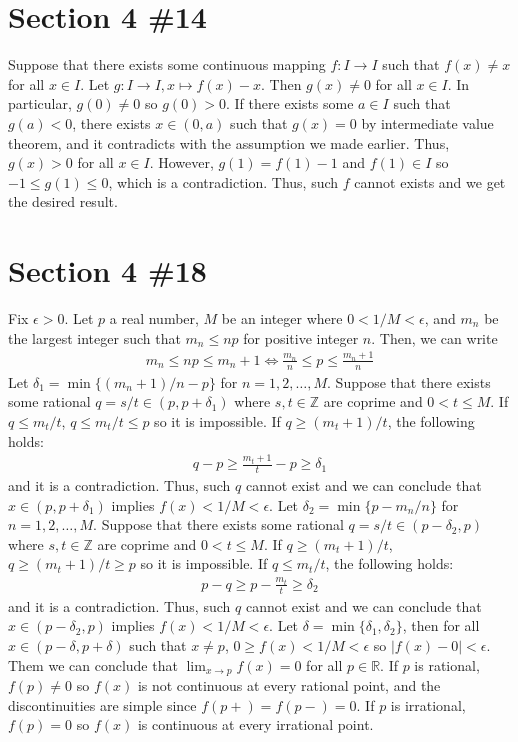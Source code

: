 \documentclass{scrartcl}
\begin{document}
\section{Section 4 \#14}
Suppose that there exists some continuous mapping \(f : I \to I\) such that \(f(x) \not = x\) for all \(x \in I\).
Let \(g: I \to I, x \mapsto f(x) - x\).
Then \(g(x) \not = 0\) for all \(x \in I\).
In particular, \(g(0) \not = 0\) so \(g(0) > 0\).
If there exists some \(a \in I\) such that \(g(a) < 0\), there exists \(x \in (0, a)\) such that \(g(x) = 0\) by intermediate value theorem, and it contradicts with the assumption we made earlier.
Thus, \(g(x) > 0\) for all \(x \in I\).
However, \(g(1) = f(1) - 1\) and \(f(1) \in I\) so \(-1 \leq g(1) \leq 0\), which is a contradiction.
Thus, such \(f\) cannot exists and we get the desired result.

\section{Section 4 \#18}
Fix \(\epsilon > 0\).
Let \(p\) a real number, \(M\) be an integer where \(0 < 1 / M < \epsilon\), and \(m_n\) be the largest integer such that \(m_n \leq np\) for positive integer \(n\).
Then, we can write
\begin{align*}
  m_n \leq np \leq m_n + 1 \Longleftrightarrow \frac{m_n}{n} \leq p \leq \frac{m_n + 1}{n}
\end{align*}
Let \(\delta_1 = \min \{(m_n + 1) / n - p\}\) for \(n = 1, 2, \dots, M\).
Suppose that there exists some rational \(q = s / t \in (p, p + \delta_1)\) where \(s, t \in \mathbb{Z}\) are coprime and \(0 < t \leq M\).
If \(q \leq m_t / t\), \(q \leq m_t / t \leq p\) so it is impossible.
If \(q \geq (m_t + 1) / t\), the following holds:
\begin{align*}
  q - p \geq \frac{m_t + 1}{t} - p \geq \delta_1
\end{align*}
and it is a contradiction.
Thus, such \(q\) cannot exist and we can conclude that \(x \in (p, p + \delta_1)\) implies \(f(x) < 1 / M < \epsilon\).
Let \(\delta_2 = \min\{p - m_n / n\}\) for \(n = 1, 2, \dots, M\).
Suppose that there exists some rational \(q = s / t \in (p - \delta_2, p)\) where \(s, t \in \mathbb{Z}\) are coprime and \(0 < t \leq M\).
If \(q \geq (m_t + 1) / t\), \(q \geq (m_t + 1) / t \geq p\) so it is impossible.
If \(q \leq m_t / t\), the following holds:
\begin{align*}
  p - q \geq p - \frac{m_t}{t} \geq \delta_2
\end{align*}
and it is a contradiction.
Thus, such \(q\) cannot exist and we can conclude that \(x \in (p - \delta_2, p)\) implies \(f(x) < 1 / M < \epsilon\).
Let \(\delta = \min \{\delta_1, \delta_2\}\), then for all \(x \in (p - \delta, p + \delta)\) such that \(x \not = p\), \(0 \geq f(x) < 1 / M < \epsilon\) so \(|f(x) - 0| < \epsilon\).
Them we can conclude that \(\lim_{x \to p} f(x) = 0\) for all \(p \in \mathbb{R}\).
If \(p\) is rational, \(f(p) \not = 0\) so \(f(x)\) is not continuous at every rational point, and the discontinuities are simple since \(f(p+) = f(p-) = 0\).
If \(p\) is irrational, \(f(p) = 0\) so \(f(x)\) is continuous at every irrational point.
\end{document}
